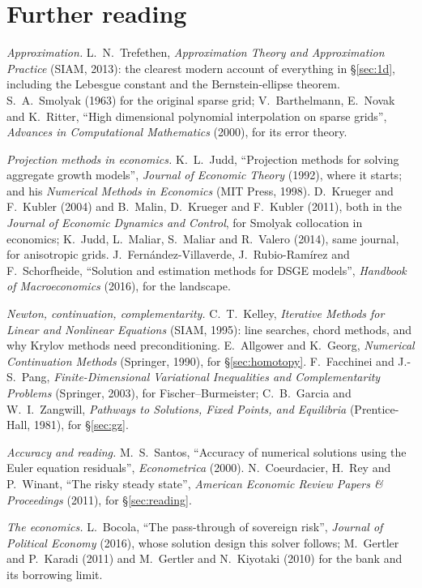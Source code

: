 \documentclass[10pt,a4paper]{article}
\theoremstyle{plain}
\theoremstyle{remark}
\begin{document}
\section{Further reading}

\noindent\emph{Approximation.} L.\ N.\ Trefethen, \emph{Approximation Theory and Approximation
Practice} (SIAM, 2013): the clearest modern account of everything in \S\ref{sec:1d}, including the
Lebesgue constant and the Bernstein-ellipse theorem. S.\ A.\ Smolyak (1963) for the original sparse
grid; V.\ Barthelmann, E.\ Novak and K.\ Ritter, ``High dimensional polynomial interpolation on sparse
grids'', \emph{Advances in Computational Mathematics} (2000), for its error theory.

\noindent\emph{Projection methods in economics.} K.\ L.\ Judd, ``Projection methods for solving
aggregate growth models'', \emph{Journal of Economic Theory} (1992), where it starts; and his
\emph{Numerical Methods in Economics} (MIT Press, 1998). D.\ Krueger and F.\ Kubler (2004) and B.\
Malin, D.\ Krueger and F.\ Kubler (2011), both in the \emph{Journal of Economic Dynamics and Control},
for Smolyak collocation in economics; K.\ Judd, L.\ Maliar, S.\ Maliar and R.\ Valero (2014), same
journal, for anisotropic grids. J.\ Fern\'andez-Villaverde, J.\ Rubio-Ram\'irez and F.\ Schorfheide,
``Solution and estimation methods for DSGE models'', \emph{Handbook of Macroeconomics} (2016), for the
landscape.

\noindent\emph{Newton, continuation, complementarity.} C.\ T.\ Kelley, \emph{Iterative Methods for
Linear and Nonlinear Equations} (SIAM, 1995): line searches, chord methods, and why Krylov methods need
preconditioning. E.\ Allgower and K.\ Georg, \emph{Numerical Continuation Methods} (Springer, 1990),
for \S\ref{sec:homotopy}. F.\ Facchinei and J.-S.\ Pang, \emph{Finite-Dimensional Variational Inequalities
and Complementarity Problems} (Springer, 2003), for Fischer--Burmeister; C.\ B.\ Garcia and W.\ I.\
Zangwill, \emph{Pathways to Solutions, Fixed Points, and Equilibria} (Prentice-Hall, 1981), for
\S\ref{sec:gz}.

\noindent\emph{Accuracy and reading.} M.\ S.\ Santos, ``Accuracy of numerical solutions using the Euler
equation residuals'', \emph{Econometrica} (2000). N.\ Coeurdacier, H.\ Rey and P.\ Winant, ``The risky
steady state'', \emph{American Economic Review Papers \& Proceedings} (2011), for \S\ref{sec:reading}.

\noindent\emph{The economics.} L.\ Bocola, ``The pass-through of sovereign risk'', \emph{Journal of
Political Economy} (2016), whose solution design this solver follows; M.\ Gertler and P.\ Karadi (2011)
and M.\ Gertler and N.\ Kiyotaki (2010) for the bank and its borrowing limit.
\end{document}
